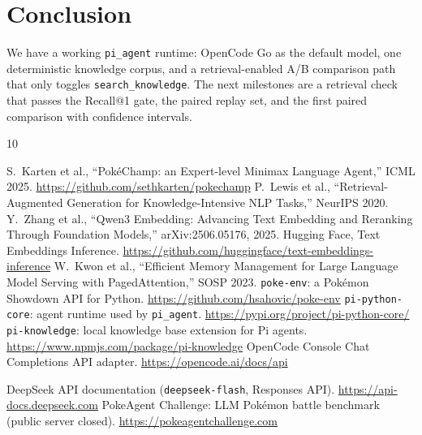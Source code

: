 \documentclass[11pt,a4paper]{article}
\newcommand{\code}[1]{\texttt{#1}}
\begin{document}
\section{Conclusion}

We have a working \code{pi\_agent} runtime: OpenCode Go as the default model, one deterministic knowledge
corpus, and a retrieval-enabled A/B comparison path that only toggles \code{search\_knowledge}. The next milestones are a
retrieval check that passes the Recall@1 gate, the paired replay set, and the first paired comparison
with confidence intervals.

\begin{thebibliography}{10}
\small
\raggedright
\setlength{\itemsep}{0pt}
 S.~Karten et al., ``Pok\'eChamp: an Expert-level Minimax Language Agent,'' ICML 2025.
  \url{https://github.com/sethkarten/pokechamp}
 P.~Lewis et al., ``Retrieval-Augmented Generation for Knowledge-Intensive NLP Tasks,''
  NeurIPS 2020.
 Y.~Zhang et al., ``Qwen3 Embedding: Advancing Text Embedding and Reranking Through
  Foundation Models,'' arXiv:2506.05176, 2025.
 Hugging Face, Text Embeddings Inference. \url{https://github.com/huggingface/text-embeddings-inference}
 W.~Kwon et al., ``Efficient Memory Management for Large Language Model Serving with
  PagedAttention,'' SOSP 2023.
 \code{poke-env}: a Pok\'emon Showdown API for Python.
  \url{https://github.com/hsahovic/poke-env}
 \code{pi-python-core}: agent runtime used by \code{pi\_agent}.
  \url{https://pypi.org/project/pi-python-core/}
 \code{pi-knowledge}: local knowledge base extension for Pi agents.
  \url{https://www.npmjs.com/package/pi-knowledge}
 OpenCode Console Chat Completions API adapter.
  \url{https://opencode.ai/docs/api}

 DeepSeek API documentation (\code{deepseek-flash}, Responses API).
  \url{https://api-docs.deepseek.com}
 PokeAgent Challenge: LLM Pok\'emon battle benchmark (public server closed).
  \url{https://pokeagentchallenge.com}
\end{thebibliography}
\end{document}
